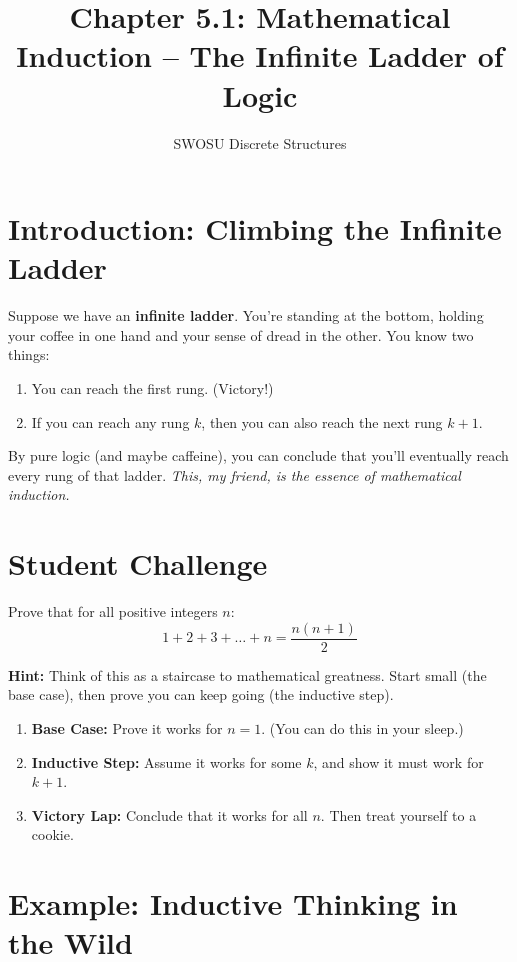 \documentclass[12pt]{article}
\title{Chapter 5.1: Mathematical Induction – The Infinite Ladder of Logic}
\author{SWOSU Discrete Structures}
\date{}
\begin{document}
\maketitle

\section*{Introduction: Climbing the Infinite Ladder}

Suppose we have an \textbf{infinite ladder}. You’re standing at the bottom, holding your coffee in one hand and your sense of dread in the other.  
You know two things:
\begin{enumerate}
  \item You can reach the first rung. (Victory!)
  \item If you can reach any rung $k$, then you can also reach the next rung $k+1$.
\end{enumerate}

\noindent By pure logic (and maybe caffeine), you can conclude that you’ll eventually reach every rung of that ladder.  
\textit{This, my friend, is the essence of mathematical induction.}

\section*{Student Challenge}

Prove that for all positive integers $n$:
\[
1 + 2 + 3 + \dots + n = \frac{n(n+1)}{2}
\]
\vspace{2em}

\noindent \textbf{Hint:} Think of this as a staircase to mathematical greatness.  
Start small (the base case), then prove you can keep going (the inductive step).

\begin{enumerate}[label=\alph*)]
  \item \textbf{Base Case:} Prove it works for $n=1$. (You can do this in your sleep.)
  \item \textbf{Inductive Step:} Assume it works for some $k$, and show it must work for $k+1$.
  \item \textbf{Victory Lap:} Conclude that it works for all $n$. Then treat yourself to a cookie.
\end{enumerate}

\section*{Example: Inductive Thinking in the Wild}
\end{document}
